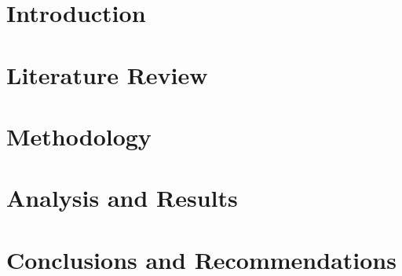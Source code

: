 \documentclass[12pt,letterpaper, oneside]{book}
\begin{document}
\frontmatter
\flyleaf                        %
\disclaimerpage                 %
\titlepageAFIT                      %
\approvalpage                   %


\tableofcontents                %
\listoffigures                  %
\listoftables                   %


\mainmatter
\renewcommand\thechapter{\arabic{chapter}}
\chapter{Introduction}
\label{chap:Introduction}
	
\chapter{Literature Review}
\label{chap:Literature Review}
			
\chapter{Methodology}
\label{chap:Methodology}
			
\chapter{Analysis and Results}
\label{chap:Results}

\chapter{Conclusions and Recommendations}
\label{chap:Conclusion}
	
\appendix
	

\backmatter
\singlespace
%
%

 						

%
\clearpage

%
%

\end{document}
